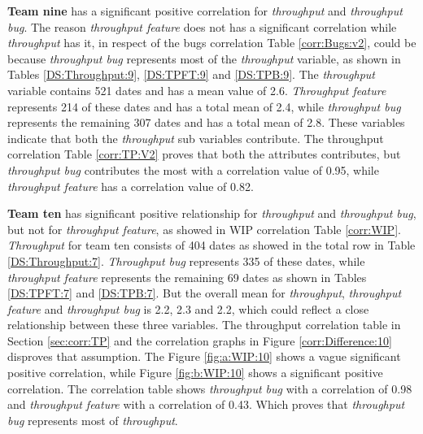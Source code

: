 \documentclass[UKenglish]{ifimaster}  %
\begin{document}
\textbf{Team nine} has a significant positive correlation for \textit{throughput} and \textit{throughput bug}. The reason \textit{throughput feature} does not has a significant correlation while \textit{throughput} has it, in respect of the bugs correlation Table \ref{corr:Bugs:v2}, could be because \textit{throughput bug} represents most of the \textit{throughput} variable, as shown in Tables \ref{DS:Throughput:9}, \ref{DS:TPFT:9} and \ref{DS:TPB:9}. The \textit{throughput} variable contains 521 dates and has a mean value of 2.6. \textit{Throughput feature} represents 214 of these dates and has a total mean of 2.4, while \textit{throughput bug} represents the remaining 307 dates and has a total mean of 2.8. These variables indicate that both the \textit{throughput} sub variables contribute. The throughput correlation Table \ref{corr:TP:V2} proves that both the attributes contributes, but \textit{throughput bug} contributes the most with a correlation value of 0.95, while \textit{throughput feature} has a correlation value of 0.82. 


\textbf{Team ten} has significant positive relationship for \textit{throughput} and \textit{throughput bug}, but not for \textit{throughput feature}, as showed in WIP correlation Table \ref{corr:WIP}. \textit{Throughput} for team ten consists of 404 dates as showed in the total row in Table \ref{DS:Throughput:7}. \textit{Throughput bug} represents 335 of these dates, while \textit{throughput feature} represents the remaining 69 dates as shown in Tables \ref{DS:TPFT:7} and \ref{DS:TPB:7}. But the overall mean for \textit{throughput}, \textit{throughput feature} and \textit{throughput bug} is 2.2, 2.3 and 2.2, which could reflect a close relationship between these three variables. The throughput correlation table in Section \ref{sec:corr:TP} and the correlation graphs in Figure \ref{corr:Difference:10} disproves that assumption. The Figure \ref{fig:a:WIP:10} shows a vague significant positive correlation, while Figure \ref{fig:b:WIP:10} shows a significant positive correlation. The correlation table shows  \textit{throughput bug} with a correlation of 0.98 and \textit{throughput feature} with a correlation of 0.43.  Which proves that \textit{throughput bug} represents most of \textit{throughput}. 
\end{document}
